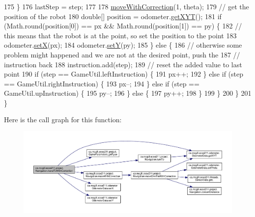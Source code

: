 \begin{DoxyCode}
175       \}
176       lastStep = step;
177 
178       \hyperlink{classca_1_1mcgill_1_1ecse211_1_1project_1_1_navigation_a48eeb9ae2da23664421e8da5642054c7}{moveWithCorrection}(1, theta);
179       \textcolor{comment}{// get the position of the robot}
180       \textcolor{keywordtype}{double}[] position = odometer.\hyperlink{classca_1_1mcgill_1_1ecse211_1_1odometer_1_1_odometer_data_a8f40f0264c68f0cbed4fff1723ae7863}{getXYT}();
181       \textcolor{keywordflow}{if} (Math.round(position[0]) == px && Math.round(position[1]) == py) \{
182         \textcolor{comment}{// this means that the robot is at the point, so set the position to the point}
183         odometer.\hyperlink{classca_1_1mcgill_1_1ecse211_1_1odometer_1_1_odometer_data_a2911d7215e47f3064defe016b46bfeef}{setX}(px);
184         odometer.\hyperlink{classca_1_1mcgill_1_1ecse211_1_1odometer_1_1_odometer_data_a82986438cd462e66520bc62bb4bd2b75}{setY}(py);
185       \} \textcolor{keywordflow}{else} \{
186         \textcolor{comment}{// otherwise some problem might happened and we are not at the desired point, push the}
187         \textcolor{comment}{// instruction back}
188         instruction.add(step);
189         \textcolor{comment}{// reset the added value to last point}
190         \textcolor{keywordflow}{if} (step == GameUtil.leftInstruction) \{
191           px++;
192         \} \textcolor{keywordflow}{else} \textcolor{keywordflow}{if} (step == GameUtil.rightInstruction) \{
193           px--;
194         \} \textcolor{keywordflow}{else} \textcolor{keywordflow}{if} (step == GameUtil.upInstruction) \{
195           py--;
196         \} \textcolor{keywordflow}{else} \{
197           py++;
198         \}
199       \}
200     \}
201   \}
\end{DoxyCode}
Here is the call graph for this function\+:\nopagebreak
\begin{figure}[H]
\begin{center}
\leavevmode
\includegraphics[width=350pt]{classca_1_1mcgill_1_1ecse211_1_1project_1_1_navigation_ae7230e905494002087416294f12cae6a_cgraph}
\end{center}
\end{figure}
